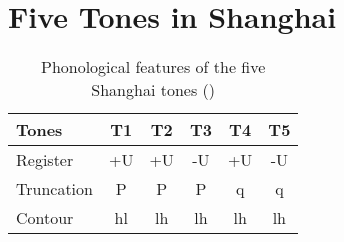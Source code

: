 \documentclass[11pt]{article}
\begin{document}
\section{Five Tones in Shanghai}
\begin{table}[h!]
	\centering
	\caption{Phonological features of the five Shanghai tones (\citep{zhu1999shanghai})} 
	\begin{tabular}{lccccc}
		\toprule
		\textbf{Tones} & \textbf{T1} & \textbf{T2} & \textbf{T3} & \textbf{T4} & \textbf{T5} \\
		\midrule
		Register   & +U & +U & -U & +U & -U \\
		Truncation & P  & P  & P  & q  & q  \\
		Contour    & hl & lh & lh & lh & lh \\
		\bottomrule
	\end{tabular}
\end{table}



\end{document}
